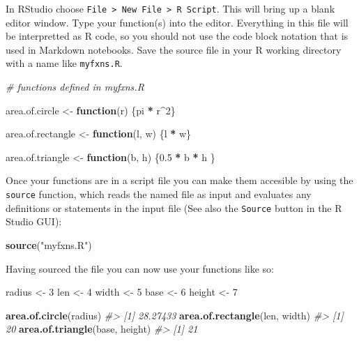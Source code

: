 \documentclass[]{book}
\newenvironment{Shaded}{\begin{snugshade}}{\end{snugshade}}
\newcommand{\CommentTok}[1]{\textcolor[rgb]{0.56,0.35,0.01}{\textit{#1}}}
\newcommand{\ControlFlowTok}[1]{\textcolor[rgb]{0.13,0.29,0.53}{\textbf{#1}}}
\newcommand{\DecValTok}[1]{\textcolor[rgb]{0.00,0.00,0.81}{#1}}
\newcommand{\FloatTok}[1]{\textcolor[rgb]{0.00,0.00,0.81}{#1}}
\newcommand{\KeywordTok}[1]{\textcolor[rgb]{0.13,0.29,0.53}{\textbf{#1}}}
\newcommand{\NormalTok}[1]{#1}
\newcommand{\OperatorTok}[1]{\textcolor[rgb]{0.81,0.36,0.00}{\textbf{#1}}}
\newcommand{\StringTok}[1]{\textcolor[rgb]{0.31,0.60,0.02}{#1}}
\theoremstyle{definition}
\theoremstyle{definition}
\theoremstyle{definition}
\theoremstyle{remark}
\begin{document}
In RStudio choose
\texttt{File\ \textgreater{}\ New\ File\ \textgreater{}\ R\ Script}.
This will bring up a blank editor window. Type your function(s) into the
editor. Everything in this file will be interpretted as R code, so you
should not use the code block notation that is used in Markdown
notebooks. Save the source file in your R working directory with a name
like \texttt{myfxns.R}.

\begin{Shaded}
\begin{Highlighting}[]
\CommentTok{# functions defined in myfxns.R}

\NormalTok{area.of.circle <-}\StringTok{ }\ControlFlowTok{function}\NormalTok{(r) \{pi }\OperatorTok{*}\StringTok{ }\NormalTok{r}\OperatorTok{^}\DecValTok{2}\NormalTok{\}}

\NormalTok{area.of.rectangle <-}\StringTok{ }\ControlFlowTok{function}\NormalTok{(l, w) \{l }\OperatorTok{*}\StringTok{ }\NormalTok{w\}}

\NormalTok{area.of.triangle <-}\StringTok{ }\ControlFlowTok{function}\NormalTok{(b, h) \{}\FloatTok{0.5} \OperatorTok{*}\StringTok{ }\NormalTok{b }\OperatorTok{*}\StringTok{ }\NormalTok{h \}}
\end{Highlighting}
\end{Shaded}

Once your functions are in a script file you can make them accesible by
using the \texttt{source} function, which reads the named file as input
and evaluates any definitions or statements in the input file (See also
the \texttt{Source} button in the R Studio GUI):

\begin{Shaded}
\begin{Highlighting}[]
\KeywordTok{source}\NormalTok{(}\StringTok{"myfxns.R"}\NormalTok{)}
\end{Highlighting}
\end{Shaded}

Having sourced the file you can now use your functions like so:

\begin{Shaded}
\begin{Highlighting}[]
\NormalTok{radius <-}\StringTok{ }\DecValTok{3}
\NormalTok{len <-}\StringTok{ }\DecValTok{4}
\NormalTok{width <-}\StringTok{ }\DecValTok{5}
\NormalTok{base <-}\StringTok{ }\DecValTok{6}
\NormalTok{height <-}\StringTok{ }\DecValTok{7}

\KeywordTok{area.of.circle}\NormalTok{(radius)}
\CommentTok{#> [1] 28.27433}
\KeywordTok{area.of.rectangle}\NormalTok{(len, width)}
\CommentTok{#> [1] 20}
\KeywordTok{area.of.triangle}\NormalTok{(base, height)}
\CommentTok{#> [1] 21}
\end{Highlighting}
\end{Shaded}
\end{document}
